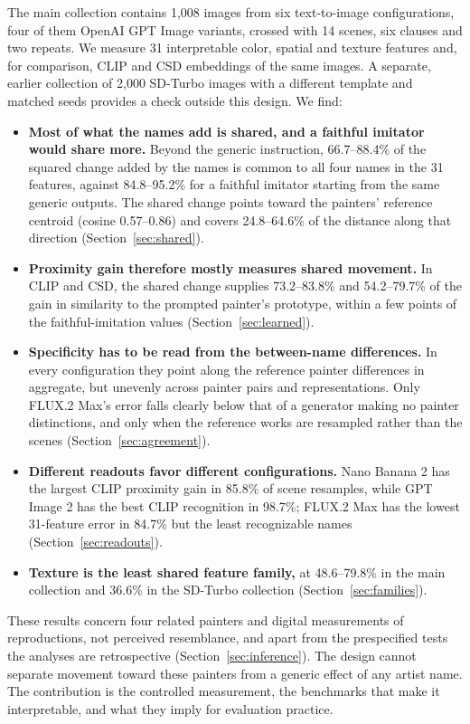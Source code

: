 \documentclass[10pt]{article}
\begin{document}
The main collection contains 1,008 images from six text-to-image configurations, four of
them OpenAI GPT Image variants, crossed with 14 scenes, six clauses and two repeats. We
measure 31 interpretable color, spatial and texture features and, for comparison, CLIP
\citep{radford2021} and CSD \citep{somepalli2024style} embeddings of the same images. A
separate, earlier collection of 2,000 SD-Turbo images with a different template and matched
seeds provides a check outside this design. We find:
\begin{itemize}
\item \textbf{Most of what the names add is shared, and a faithful imitator would share
more.} Beyond the generic instruction, 66.7--88.4\% of the squared change added by the names
is common to all four names in the 31 features, against 84.8--95.2\% for a faithful
imitator starting from the same generic outputs. The shared change points toward the
painters' reference centroid (cosine 0.57--0.86) and covers 24.8--64.6\% of the distance
along that direction (Section~\ref{sec:shared}).
\item \textbf{Proximity gain therefore mostly measures shared movement.} In CLIP and CSD,
the shared change supplies 73.2--83.8\% and 54.2--79.7\% of the gain in similarity to the
prompted painter's prototype, within a few points of the faithful-imitation values
(Section~\ref{sec:learned}).
\item \textbf{Specificity has to be read from the between-name differences.} In every
configuration they point along the reference painter differences in aggregate, but
unevenly across painter pairs and representations. Only FLUX.2 Max's error falls clearly
below that of a generator making no painter distinctions, and only when the reference works
are resampled rather than the scenes (Section~\ref{sec:agreement}).
\item \textbf{Different readouts favor different configurations.} Nano Banana 2 has the
largest CLIP proximity gain in 85.8\% of scene resamples, while GPT Image 2 has the best CLIP
recognition in 98.7\%; FLUX.2 Max has the lowest 31-feature error in 84.7\% but the least
recognizable names (Section~\ref{sec:readouts}).
\item \textbf{Texture is the least shared feature family,} at 48.6--79.8\% in the main
collection and 36.6\% in the SD-Turbo collection (Section~\ref{sec:families}).
\end{itemize}

These results concern four related painters and digital measurements of reproductions, not
perceived resemblance, and apart from the prespecified tests the analyses are retrospective
(Section~\ref{sec:inference}). The design cannot separate movement toward these painters
from a generic effect of any artist name. The contribution is the controlled measurement,
the benchmarks that make it interpretable, and what they imply for evaluation practice.
\end{document}
